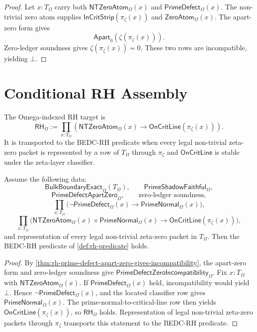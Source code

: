 \begin{proof}
Let $x:T_{\Omega}$ carry both $\mathsf{NTZeroAtom}_{\Omega}(x)$ and
$\mathsf{PrimeDefect}_{\Omega}(x)$. The non-trivial zero atom supplies
$\mathsf{InCritStrip}(\pi_{\zeta}(x))$ and
$\mathsf{ZeroAtom}_{\Omega}(x)$. The apart-zero form gives
$$
\mathsf{Apart}_{0}(\zeta(\pi_{\zeta}(x))).
$$
Zero-ledger soundness gives $\zeta(\pi_{\zeta}(x))=0$. These two rows are
incompatible, yielding $\bot$.
\end{proof}

\section{Conditional RH Assembly}
\label{sec:rh-prime-shadow-conditional-assembly}

\begin{definition}
\label{def:rh-omega-rh-interface}
The Omega-indexed RH target is
$$
\mathsf{RH}_{\Omega}
:=
\prod_{x:T_{\Omega}}
\left(
\mathsf{NTZeroAtom}_{\Omega}(x)
\to
\mathsf{OnCritLine}(\pi_{\zeta}(x))
\right).
$$
It is transported to the BEDC-RH predicate when every legal non-trivial
zeta-zero packet is represented by a row of $T_{\Omega}$ through
$\pi_{\zeta}$ and $\mathsf{OnCritLine}$ is stable under the zeta-layer
classifier.
\end{definition}

\begin{theorem}
\label{thm:rh-prime-shadow-sufficient-interface}
Assume the following data:
$$
\mathsf{BulkBoundaryExact}_{\Omega}(T_{\Omega}),
\qquad
\mathsf{PrimeShadowFaithful}_{\Omega},
$$
$$
\mathsf{PrimeDefectApartZero}_{\Omega},
\qquad
\text{zero-ledger soundness},
$$
$$
\prod_{x:T_{\Omega}}
\bigl(
\neg\mathsf{PrimeDefect}_{\Omega}(x)
\to
\mathsf{PrimeNormal}_{\Omega}(x)
\bigr),
$$
$$
\prod_{x:T_{\Omega}}
\bigl(
\mathsf{NTZeroAtom}_{\Omega}(x)
\times
\mathsf{PrimeNormal}_{\Omega}(x)
\to
\mathsf{OnCritLine}(\pi_{\zeta}(x))
\bigr),
$$
and representation of every legal non-trivial zeta-zero packet in
$T_{\Omega}$. Then the BEDC-RH predicate of \autoref{def:rh-predicate}
holds.
\end{theorem}

\begin{proof}
By \autoref{thm:rh-prime-defect-apart-zero-gives-incompatibility}, the
apart-zero form and zero-ledger soundness give
$\mathsf{PrimeDefectZeroIncompatibility}_{\Omega}$. Fix
$x:T_{\Omega}$ with $\mathsf{NTZeroAtom}_{\Omega}(x)$. If
$\mathsf{PrimeDefect}_{\Omega}(x)$ held, incompatibility would yield
$\bot$. Hence $\neg\mathsf{PrimeDefect}_{\Omega}(x)$, and the located
classifier row gives $\mathsf{PrimeNormal}_{\Omega}(x)$. The
prime-normal-to-critical-line row then yields
$\mathsf{OnCritLine}(\pi_{\zeta}(x))$, so $\mathsf{RH}_{\Omega}$ holds.
Representation of legal non-trivial zeta-zero packets through
$\pi_{\zeta}$ transports this statement to the BEDC-RH predicate.
\end{proof}

